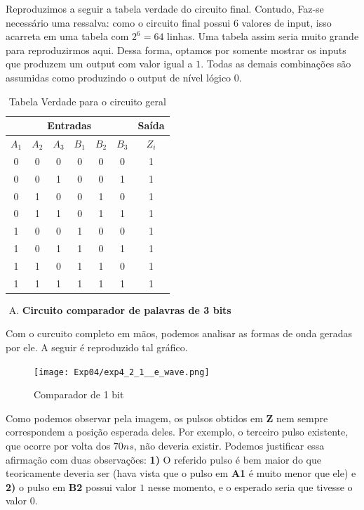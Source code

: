 \documentclass[12pt]{article}
\begin{document}
Reproduzimos a seguir a tabela verdade do circuito final. Contudo, Faz-se
necessário uma ressalva: como o circuito final possui $6$ valores de input, isso
acarreta em uma tabela com $2^{6} = 64$ linhas. Uma tabela assim seria muito
grande para reproduzirmos aqui. Dessa forma, optamos por somente mostrar os
inputs que produzem um output com valor igual a $1$. Todas as demais combinações
são assumidas como produzindo o output de nível lógico $0$.

\begin{table}[H]
    \centering
    \caption{Tabela Verdade para o circuito geral}
    \begin{tabular}{|c|c|c|c|c|c|c|}\hline
    \multicolumn{6}{|c|}{Entradas} & \multicolumn{1}{|c|}{Saída} \\\hline
    $A_{1}$ & $A_{2}$ & $A_{3}$ & $B_{1}$ & $B_{2}$ & $B_{3}$ & $Z_{i}$ \\\hline
    0 & 0 & 0 & 0 & 0 & 0 & 1 \\\hline
    0 & 0 & 1 & 0 & 0 & 1 & 1 \\\hline
    0 & 1 & 0 & 0 & 1 & 0 & 1 \\\hline
    0 & 1 & 1 & 0 & 1 & 1 & 1 \\\hline
    1 & 0 & 0 & 1 & 0 & 0 & 1 \\\hline
    1 & 0 & 1 & 1 & 0 & 1 & 1 \\\hline
    1 & 1 & 0 & 1 & 1 & 0 & 1 \\\hline
    1 & 1 & 1 & 1 & 1 & 1 & 1 \\\hline
    \end{tabular}\label{tab:comparador_de_palavras_3_bits}
\end{table}


\begin{enumerate}[E)]
\item \textbf{Circuito comparador de palavras de 3 bits}
\end{enumerate}

Com o curcuito completo em mãos, podemos analisar as formas de onda geradas por
ele. A seguir é reproduzido tal gráfico.

\begin{figure}[H]
    \centering
    \texttt{[image: Exp04/exp4\_2\_1\_\_e\_wave.png]}
    \caption{Comparador de 1 bit}\label{fig:exp4_2_1__e_wave.png}
\end{figure}

Como podemos observar pela imagem, os pulsos obtidos em \textbf{Z} nem sempre
correspondem a posição esperada deles. Por exemplo, o terceiro pulso existente,
que ocorre por volta dos $70 ns$, não deveria existir. Podemos justificar essa
afirmação com duas observações: \textbf{1)} O referido pulso é bem maior do que
teoricamente deveria ser (hava vista que o pulso em \textbf{A1} é muito menor
que ele) e \textbf{2)} o pulso em \textbf{B2} possui valor $1$ nesse momento, e
o esperado seria que tivesse o valor $0$.
\end{document}
